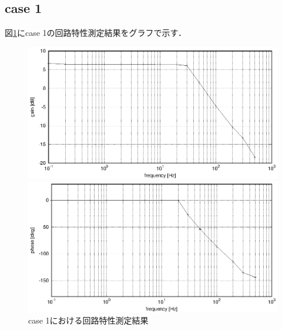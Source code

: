 \documentclass[dvipdfmx,titlepage,a4j]{jsarticle}  %
\begin{document}
\subsection{case 1}
図\ref{fig:gr:case1}にcase 1の回路特性測定結果をグラフで示す．
\begin{figure}[H]
  \centering
  \begin{minipage}{8cm}
    \centering
    \includegraphics[keepaspectratio, scale=0.6]{../data/case1-g.eps}
  \end{minipage}
  \begin{minipage}{8cm}
    \centering
    \includegraphics[keepaspectratio, scale=0.6]{../data/case1-f.eps}
  \end{minipage}
  \caption{case 1における回路特性測定結果}
  \label{fig:gr:case1}
\end{figure}
\end{document}
